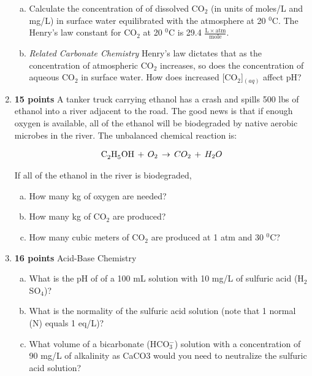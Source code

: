 \documentclass[12pt,letterpaper]{article}
\begin{document}
\begin{enumerate}
\begin{enumerate}[a)]
\item Calculate the concentration of of dissolved CO$_2$ (in units of moles/L and mg/L) in surface water equilibrated with the atmosphere at 20 $^0$C.  The Henry's law constant for CO$_2$ at 20 $^0$C is 29.4  $\mathrm{\frac{L\times atm}{mole}}$.
\item \emph{Related Carbonate Chemistry} Henry's law dictates that as the concentration of atmospheric CO$_2$ increases, so does the concentration of aqueous CO$_2$ in surface water.  How does increased [CO$_2$]$_{(aq)}$ affect pH? 
\end{enumerate}

\item \textbf{15 points}  A tanker truck carrying ethanol has a crash and spills 500 lbs of ethanol into a river adjacent to the road.  The good news is that if enough oxygen is available, all of the ethanol will be biodegraded by native aerobic microbes in the river.  The unbalanced chemical reaction is:

\begin{align*}
\cee{C_2H_5OH}\,  + \,  O_2\, \rightarrow \, CO_2 \, + \,  H_2O
\end{align*}

If all of the ethanol in the river is biodegraded,
\begin{enumerate}[a)]
\item How many kg of oxygen are needed?
\item How many kg of CO$_2$ are produced?
\item How many cubic meters of CO$_2$ are produced at 1 atm and 30 $^0$C?\\

\end{enumerate}

\item \textbf{16 points}  Acid-Base Chemistry
\begin{enumerate}[a)]
\item What is the pH of of a 100 mL solution with 10 mg/L of sulfuric acid (H$_2$SO$_4$)?  
\item What is the normality of the sulfuric acid solution (note that 1 normal (N) equals 1 eq/L)?  
\item What volume of a bicarbonate (HCO$_3^-$) solution with a concentration of 90 mg/L of alkalinity as CaCO3 would you need to neutralize the sulfuric acid solution?
\end{enumerate}


\end{enumerate}
\end{document}
